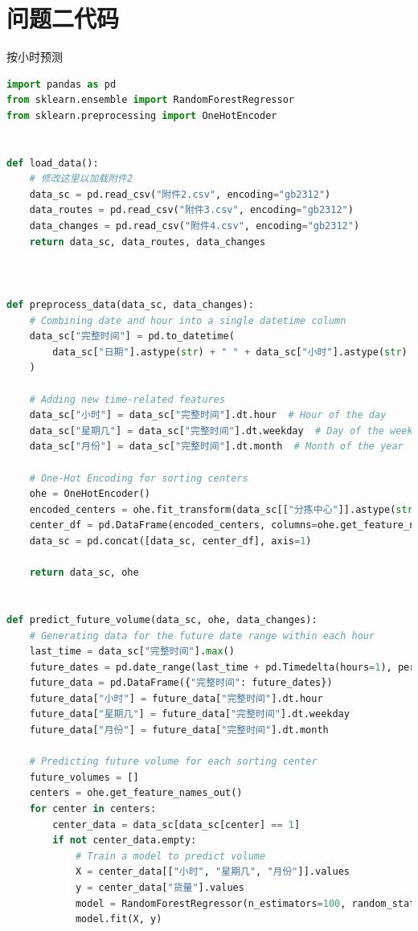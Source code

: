 \documentclass[UTF8]{article}%
\begin{document}
\section{问题二代码}
\noindent 按小时预测
\begin{lstlisting}[language=python]
import pandas as pd
from sklearn.ensemble import RandomForestRegressor
from sklearn.preprocessing import OneHotEncoder


def load_data():
    # 修改这里以加载附件2
    data_sc = pd.read_csv("附件2.csv", encoding="gb2312")
    data_routes = pd.read_csv("附件3.csv", encoding="gb2312")
    data_changes = pd.read_csv("附件4.csv", encoding="gb2312")
    return data_sc, data_routes, data_changes



def preprocess_data(data_sc, data_changes):
    # Combining date and hour into a single datetime column
    data_sc["完整时间"] = pd.to_datetime(
        data_sc["日期"].astype(str) + " " + data_sc["小时"].astype(str) + ":00"
    )

    # Adding new time-related features
    data_sc["小时"] = data_sc["完整时间"].dt.hour  # Hour of the day
    data_sc["星期几"] = data_sc["完整时间"].dt.weekday  # Day of the week (Monday=0, Sunday=6)
    data_sc["月份"] = data_sc["完整时间"].dt.month  # Month of the year

    # One-Hot Encoding for sorting centers
    ohe = OneHotEncoder()
    encoded_centers = ohe.fit_transform(data_sc[["分拣中心"]].astype(str)).toarray()
    center_df = pd.DataFrame(encoded_centers, columns=ohe.get_feature_names_out())
    data_sc = pd.concat([data_sc, center_df], axis=1)

    return data_sc, ohe


def predict_future_volume(data_sc, ohe, data_changes):
    # Generating data for the future date range within each hour
    last_time = data_sc["完整时间"].max()
    future_dates = pd.date_range(last_time + pd.Timedelta(hours=1), periods=744, freq="h")
    future_data = pd.DataFrame({"完整时间": future_dates})
    future_data["小时"] = future_data["完整时间"].dt.hour
    future_data["星期几"] = future_data["完整时间"].dt.weekday
    future_data["月份"] = future_data["完整时间"].dt.month

    # Predicting future volume for each sorting center
    future_volumes = []
    centers = ohe.get_feature_names_out()
    for center in centers:
        center_data = data_sc[data_sc[center] == 1]
        if not center_data.empty:
            # Train a model to predict volume
            X = center_data[["小时", "星期几", "月份"]].values
            y = center_data["货量"].values
            model = RandomForestRegressor(n_estimators=100, random_state=42)
            model.fit(X, y)


\end{lstlisting}
\end{document}
